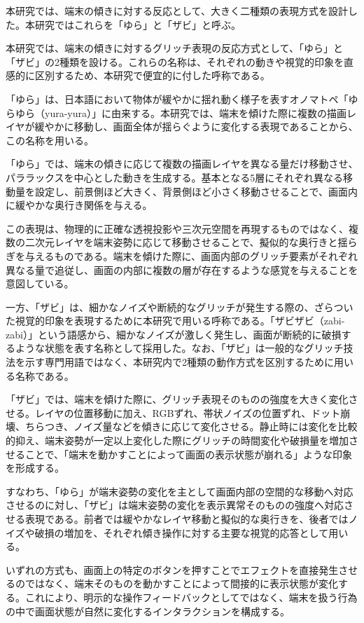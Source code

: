 本研究では、端末の傾きに対する反応として、大きく二種類の表現方式を設計した。本研究ではこれらを「ゆら」と「ザビ」と呼ぶ。

本研究では、端末の傾きに対するグリッチ表現の反応方式として、「ゆら」と「ザビ」の2種類を設ける。これらの名称は、それぞれの動きや視覚的印象を直感的に区別するため、本研究で便宜的に付した呼称である。

「ゆら」は、日本語において物体が緩やかに揺れ動く様子を表すオノマトペ「ゆらゆら（yura-yura）」に由来する。本研究では、端末を傾けた際に複数の描画レイヤが緩やかに移動し、画面全体が揺らぐように変化する表現であることから、この名称を用いる。

「ゆら」では、端末の傾きに応じて複数の描画レイヤを異なる量だけ移動させ、パララックスを中心とした動きを生成する。基本となる5層にそれぞれ異なる移動量を設定し、前景側ほど大きく、背景側ほど小さく移動させることで、画面内に緩やかな奥行き関係を与える。

この表現は、物理的に正確な透視投影や三次元空間を再現するものではなく、複数の二次元レイヤを端末姿勢に応じて移動させることで、擬似的な奥行きと揺らぎを与えるものである。端末を傾けた際に、画面内部のグリッチ要素がそれぞれ異なる量で追従し、画面の内部に複数の層が存在するような感覚を与えることを意図している。

一方、「ザビ」は、細かなノイズや断続的なグリッチが発生する際の、ざらついた視覚的印象を表現するために本研究で用いる呼称である。「ザビザビ（zabi-zabi）」という語感から、細かなノイズが激しく発生し、画面が断続的に破損するような状態を表す名称として採用した。なお、「ザビ」は一般的なグリッチ技法を示す専門用語ではなく、本研究内で2種類の動作方式を区別するために用いる名称である。

「ザビ」では、端末を傾けた際に、グリッチ表現そのものの強度を大きく変化させる。レイヤの位置移動に加え、RGBずれ、帯状ノイズの位置ずれ、ドット崩壊、ちらつき、ノイズ量などを傾きに応じて変化させる。静止時には変化を比較的抑え、端末姿勢が一定以上変化した際にグリッチの時間変化や破損量を増加させることで、「端末を動かすことによって画面の表示状態が崩れる」ような印象を形成する。

すなわち、「ゆら」が端末姿勢の変化を主として画面内部の空間的な移動へ対応させるのに対し、「ザビ」は端末姿勢の変化を表示異常そのものの強度へ対応させる表現である。前者では緩やかなレイヤ移動と擬似的な奥行きを、後者ではノイズや破損の増加を、それぞれ傾き操作に対する主要な視覚的応答として用いる。

いずれの方式も、画面上の特定のボタンを押すことでエフェクトを直接発生させるのではなく、端末そのものを動かすことによって間接的に表示状態が変化する。これにより、明示的な操作フィードバックとしてではなく、端末を扱う行為の中で画面状態が自然に変化するインタラクションを構成する。


